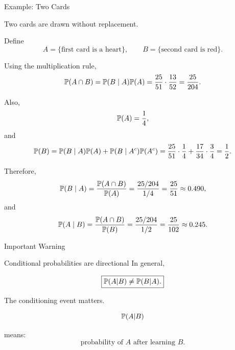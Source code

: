\begin{frame}{Example: Two Cards}

Two cards are drawn without replacement.

Define
\[
A=\{\text{first card is a heart}\},
\qquad
B=\{\text{second card is red}\}.
\]

Using the multiplication rule,
\[
\mathbb{P}(A\cap B)
=
\mathbb{P}(B\mid A)\mathbb{P}(A)
=
\frac{25}{51}\cdot\frac{13}{52}
=
\frac{25}{204}.
\]

Also,
\[
\mathbb{P}(A)=\frac14,
\]
and
\[
\mathbb{P}(B)
=
\mathbb{P}(B\mid A)\mathbb{P}(A)
+
\mathbb{P}(B\mid A^c)\mathbb{P}(A^c)
=
\frac{25}{51}\cdot\frac14
+
\frac{17}{34}\cdot\frac34
=
\frac12.
\]

Therefore,
\[
\mathbb{P}(B\mid A)
=
\frac{\mathbb{P}(A\cap B)}{\mathbb{P}(A)}
=
\frac{25/204}{1/4}
=
\frac{25}{51}
\approx0.490,
\]
and
\[
\mathbb{P}(A\mid B)
=
\frac{\mathbb{P}(A\cap B)}{\mathbb{P}(B)}
=
\frac{25/204}{1/2}
=
\frac{25}{102}
\approx0.245.
\]

\end{frame}

\begin{frame}{Important Warning}
\begin{keybox}{Conditional probabilities are directional}
In general,

\[
\boxed{
\mathbb{P}(A|B)\neq\mathbb{P}(B|A).
}
\]
\end{keybox}

\vspace{0.25cm}

The conditioning event matters.

\vspace{0.25cm}

\[
\mathbb{P}(A|B)
\]

means:
\[
\text{probability of } A
\text{ after learning } B.
\]


\end{frame}


